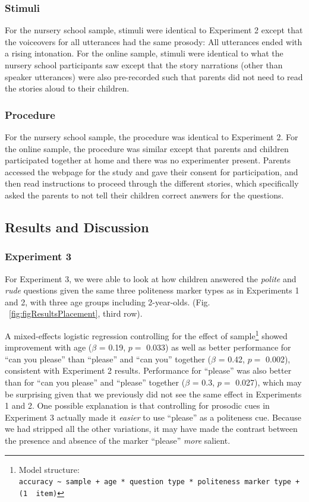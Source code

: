\documentclass[oneside]{report}
\begin{document}
\subsubsection{Stimuli}\label{stimuli}

For the nursery school sample, stimuli were identical to Experiment 2
except that the voiceovers for all utterances had the same prosody: All
utterances ended with a rising intonation. For the online sample,
stimuli were identical to what the nursery school participants saw
except that the story narrations (other than speaker utterances) were
also pre-recorded such that parents did not need to read the stories
aloud to their children.

\subsubsection{Procedure}\label{procedure-2}

For the nursery school sample, the procedure was identical to Experiment
2. For the online sample, the procedure was similar except that parents
and children participated together at home and there was no experimenter
present. Parents accessed the webpage for the study and gave their
consent for participation, and then read instructions to proceed through
the different stories, which specifically asked the parents to not tell
their children correct answers for the questions.

\subsection{Results and Discussion}\label{results-and-discussion-2}

\subsubsection{Experiment 3}\label{experiment-3-1}

For Experiment 3, we were able to look at how children answered the
\emph{polite} and \emph{rude} questions given the same three politeness
marker types as in Experiments 1 and 2, with three age groups including
2-year-olds. (Fig. ~\ref{fig:figResultsPlacement}, third row).

A mixed-effects logistic regression controlling for the effect of
sample\footnote{Model structure:
  \texttt{accuracy\ \textasciitilde{}\ sample\ +\ age\ *\ question\ type\ *\ politeness\ marker\ type\ +\ (1\ \textbar{}\ item)}}
showed improvement with age (\(\beta\) = 0.19, \(p =\) 0.033) as well as
better performance for ``can you please'' than ``please'' and ``can
you'' together (\(\beta\) = 0.42, \(p =\) 0.002), consistent with
Experiment 2 results. Performance for ``please'' was also better than
for ``can you please'' and ``please'' together (\(\beta\) = 0.3, \(p =\)
0.027), which may be surprising given that we previously did not see the
same effect in Experiments 1 and 2. One possible explanation is that
controlling for prosodic cues in Experiment 3 actually made it
\emph{easier} to use ``please'' as a politeness cue. Because we had
stripped all the other variations, it may have made the contrast between
the presence and absence of the marker ``please'' \emph{more} salient.
\end{document}
